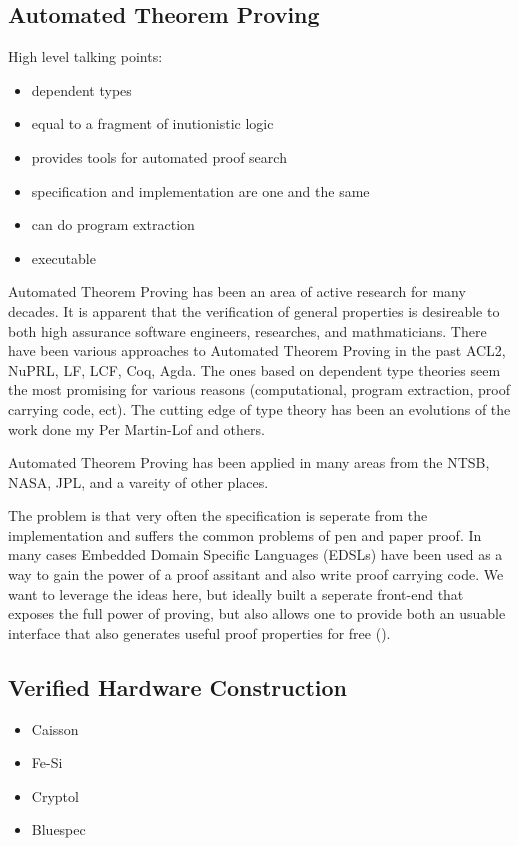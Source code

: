 \documentclass[12pt, titlepage]{article}
\begin{document}
\subsection{Automated Theorem Proving}
High level talking points: \\
\begin{itemize}
    \item dependent types
    \item equal to a fragment of inutionistic logic
    \item provides tools for automated proof search
    \item specification and implementation are one and the same
    \item can do program extraction
    \item executable 
\end{itemize}

Automated Theorem Proving has been an area of active research for many decades. It is apparent that the
verification of general properties is desireable to both high assurance software engineers, researches, and
mathmaticians. There have been various approaches to Automated Theorem Proving in the past ACL2, NuPRL, LF,
LCF, Coq, Agda. The ones based on dependent type theories seem the most promising for various reasons 
(computational, program extraction, proof carrying code, ect). The cutting edge of type theory has been
an evolutions of the work done my Per Martin-Lof and others.

Automated Theorem Proving has been applied in many areas from the NTSB, NASA, JPL, and a vareity of other places.

The problem is that very often the specification is seperate from the implementation and suffers the common
problems of pen and paper proof. In many cases Embedded Domain Specific Languages (EDSLs)
have been used as a way to gain the power of a proof assitant and also write proof carrying code. We want
to leverage the ideas here, but ideally built a seperate front-end that exposes the full power of proving,
but also allows one to provide both an usuable interface that also generates useful proof properties for
free ().
\\

\subsection{Verified Hardware Construction}
\begin{itemize}
    \item Caisson \cite{Li:2011:CHD:1993498.1993512}
    \item Fe-Si \cite{fesi}
    \item Cryptol
    \item Bluespec
\end{itemize}
\end{document}
